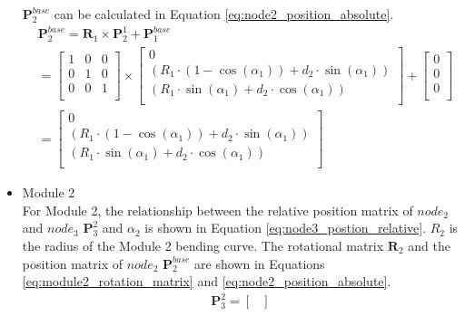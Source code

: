 \begin{itemize}
    $\textbf{P}_{2}^{base}$ can be calculated in Equation \ref{eq:node2_position_absolute}.
    \begin{align}
        &\textbf{P}_{2}^{base} = \textbf{R}_{1} \times \textbf{P}_{2}^{1} + \textbf{P}_{1}^{base} \nonumber \\
        &=
        \begin{bmatrix}
            1 & 0 & 0 \\
            0 & 1 & 0 \\
            0 & 0 & 1 \\
        \end{bmatrix}
        \times
        \begin{bmatrix}
            0 \\
            (R_1\cdot(1-\cos(\alpha_1)) + d_2\cdot \sin(\alpha_1)) \\
            (R_1\cdot \sin(\alpha_1) + d_2\cdot \cos(\alpha_1)) \\
        \end{bmatrix}
        +
        \begin{bmatrix}
            0 \\
            0 \\
            0 \\
        \end{bmatrix} \nonumber \\
        &=
        \begin{bmatrix}
            0 \\
            (R_1\cdot(1-\cos(\alpha_1)) + d_2\cdot \sin(\alpha_1)) \\
            (R_1\cdot \sin(\alpha_1) + d_2\cdot \cos(\alpha_1)) \\
        \end{bmatrix}
        \label{eq:node2_position_absolute}
    \end{align}
    \item Module 2 \\
    For Module 2, the relationship between the relative position matrix of $node_2$ and $node_3$ $\textbf{P}_{3}^{2}$ 
    and $\alpha_2$ is shown in Equation \ref{eq:node3_postion_relative}. $R_2$ is the radius of the Module 2 bending 
    curve. The rotational matrix $\textbf{R}_{2}$ and the position matrix of $node_2$ $\textbf{P}_{2}^{base}$ are shown 
    in Equations \ref*{eq:module2_rotation_matrix} and \ref{eq:node2_position_absolute}.
    \begin{align}
        \textbf{P}_{3}^{2} = 
        \begin{bmatrix}

\end{bmatrix}
\end{align}
\end{itemize}
